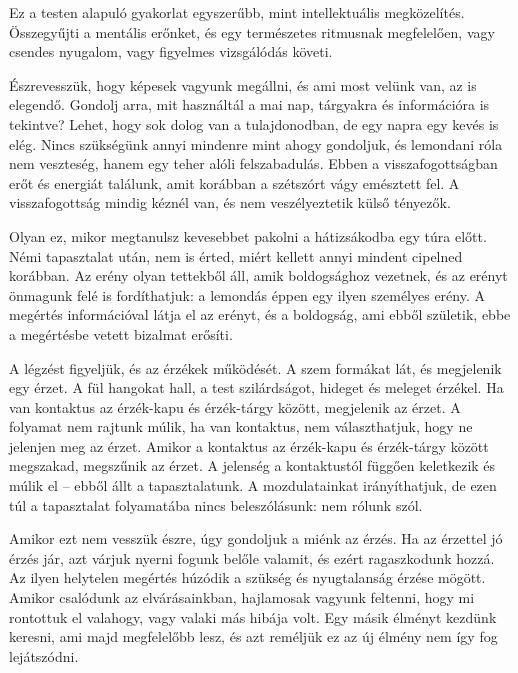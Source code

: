 Ez a testen alapuló gyakorlat egyszerűbb, mint intellektuális
megközelítés. Összegyűjti a mentális erőnket, és egy természetes
ritmusnak megfelelően, vagy csendes nyugalom, vagy figyelmes vizsgálódás
követi.

Észrevesszük, hogy képesek vagyunk megállni, és ami most velünk van, az
is elegendő. Gondolj arra, mit használtál a mai nap, tárgyakra és
információra is tekintve? Lehet, hogy sok dolog van a tulajdonodban, de
egy napra egy kevés is elég. Nincs szükségünk annyi mindenre mint ahogy
gondoljuk, és lemondani róla nem veszteség, hanem egy teher alóli
felszabadulás. Ebben a visszafogottságban erőt és energiát találunk,
amit korábban a szétszórt vágy emésztett fel. A visszafogottság mindig
kéznél van, és nem veszélyeztetik külső tényezők.

Olyan ez, mikor megtanulsz kevesebbet pakolni a hátizsákodba egy túra
előtt. Némi tapasztalat után, nem is érted, miért kellett annyi mindent
cipelned korábban. Az erény olyan tettekből áll, amik boldogsághoz
vezetnek, és az erényt önmagunk felé is fordíthatjuk: a lemondás éppen
egy ilyen személyes erény. A megértés információval látja el az erényt,
és a boldogság, ami ebből születik, ebbe a megértésbe vetett bizalmat
erősíti.


A légzést figyeljük, és az érzékek működését. A szem formákat lát, és
megjelenik egy érzet. A fül hangokat hall, a test szilárdságot, hideget
és meleget érzékel. Ha van kontaktus az érzék-kapu és érzék-tárgy
között, megjelenik az érzet. A folyamat nem rajtunk múlik, ha van
kontaktus, nem választhatjuk, hogy ne jelenjen meg az érzet. Amikor a
kontaktus az érzék-kapu és érzék-tárgy között megszakad, megszűnik az
érzet. A jelenség a kontaktustól függően keletkezik és múlik el -- ebből
állt a tapasztalatunk. A mozdulatainkat irányíthatjuk, de ezen túl a
tapasztalat folyamatába nincs beleszólásunk: nem rólunk szól.

Amikor ezt nem vesszük észre, úgy gondoljuk a miénk az érzés. Ha az
érzettel jó érzés jár, azt várjuk nyerni fogunk belőle valamit, és ezért
ragaszkodunk hozzá. Az ilyen helytelen megértés húzódik a szükség és
nyugtalanság érzése mögött. Amikor csalódunk az elvárásainkban,
hajlamosak vagyunk feltenni, hogy mi rontottuk el valahogy, vagy valaki
más hibája volt. Egy másik élményt kezdünk keresni, ami majd megfelelőbb
lesz, és azt reméljük ez az új élmény nem így fog lejátszódni.

\enlargethispage*{2\baselineskip}

